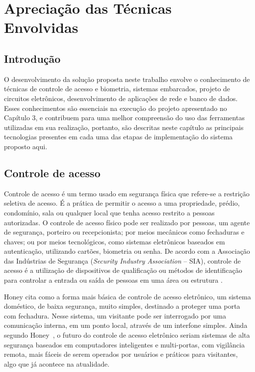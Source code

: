 \chapter{Apreciação das Técnicas Envolvidas\label{cap:fundamentacao}}

\section{Introdução}
  
  
  O desenvolvimento da solução proposta neste trabalho envolve o conhecimento de técnicas de controle de acesso e biometria, sistemas embarcados, projeto de circuitos eletrônicos, desenvolvimento de aplicações de rede e banco de dados. Esses conhecimentos são essenciais na execução do projeto apresentado no Capítulo 3, e contribuem para uma melhor compreensão do uso das ferramentas utilizadas em sua realização, portanto, são descritas neste capítulo as principais tecnologias presentes em cada uma das etapas de implementação do sistema proposto aqui.



\section{Controle de acesso}

  Controle de acesso é um termo usado em segurança física que refere-se a restrição seletiva de acesso. É a prática de permitir o acesso a uma propriedade, prédio, condomínio, sala ou qualquer local que tenha acesso restrito a pessoas autorizadas. O controle de acesso físico pode ser realizado por pessoas, um agente de segurança, porteiro ou recepcionista; por meios mecânicos como fechaduras e chaves; ou por meios tecnológicos, como sistemas eletrônicos baseados em autenticação, utilizando cartões, biometria ou senha. De acordo com a Associação das Indústrias de Segurança (\textit{Security Industry Association} -- SIA), controle de acesso é a utilização de dispositivos de qualificação ou métodos de identificação para controlar a entrada ou saída de pessoas em uma área ou estrutura \cite{privatesecurity}.


  Honey \cite{electronicaccesscontrol} cita como a forma mais básica de controle de acesso eletrônico, um sistema doméstico, de baixa segurança, muito simples, destinado a proteger uma porta com fechadura. Nesse sistema, um visitante pode ser interrogado por uma comunicação interna, em um ponto local, através de um interfone simples. Ainda segundo Honey~\cite{electronicaccesscontrol}, o futuro do controle de acesso eletrônico seriam sistemas de alta segurança baseados em computadores inteligentes e multi-portas, com vigilância remota, mais fáceis de serem operados por usuários e práticos para visitantes, algo que já acontece na atualidade.



